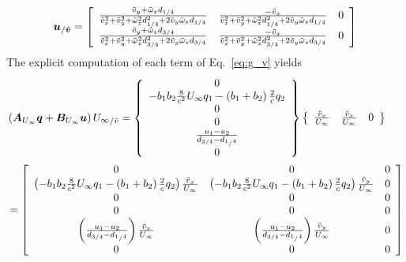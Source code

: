 \begin{equation}
	\bm{u}_{/\tilde{\bm{v}}} = \left[
	\begin{array}{ccc}
	\frac{\tilde{v}_y + \tilde{\omega}_z d_{1/4}}{\tilde{v}_x^2 + \tilde{v}_y^2 + 
		\tilde{\omega}_z^2 d_{1/4}^2 + 2 \tilde{v}_y \tilde{\omega}_z d_{1/4}} &
	\frac{-\tilde{v}_x}{\tilde{v}_x^2 + \tilde{v}_y^2 + 
		\tilde{\omega}_z^2 d_{1/4}^2 + 2 \tilde{v}_y \tilde{\omega}_z d_{1/4}} &
	0\\
	\frac{\tilde{v}_y + \tilde{\omega}_z d_{3/4}}{\tilde{v}_x^2 + \tilde{v}_y^2 + 
		\tilde{\omega}_z^2 d_{3/4}^2 + 2 \tilde{v}_y \tilde{\omega}_z d_{3/4}} &
	\frac{-\tilde{v}_x}{\tilde{v}_x^2 + \tilde{v}_y^2 + 
		\tilde{\omega}_z^2 d_{3/4}^2 + 2 \tilde{v}_y \tilde{\omega}_z d_{3/4}} &
	0
	\end{array}
	\right]
\end{equation}
The explicit computation of each term of Eq.~\ref{eq:g_v} yields
\begin{align}
&\left( \bm{A}_{U_\infty} \bm{q} + \bm{B}_{U_\infty} \bm{u}  \right) {U_\infty}_{/\tilde{v}}
	= \left\{
		\begin{array}{c}
			0 \\
			-b_1 b_2 \frac{8}{c^2} U_\infty q_1 - \left( b_1+b_2 \right) \frac{2}{c} q_2 \\
			0 \\
			0 \\
			\frac{u_1-u_2}{d_{3/4}-d_{1_/4}}\\
			0 
		\end{array}\right\}
		\left\{
		\begin{array}{ccc}
			\frac{\tilde{v}_x}{U_\infty} &
			\frac{\tilde{v}_x}{U_\infty} &
			0
		\end{array}\right\} \\
	&= \left[
		\begin{array}{ccc}
			0 & 0 & 0\\
			\left( -b_1 b_2 \frac{8}{c^2} U_\infty q_1 - \left( b_1+b_2 \right) \frac{2}{c} q_2 \right) \frac{\tilde{v}_x}{U_\infty} &
			\left( -b_1 b_2 \frac{8}{c^2} U_\infty q_1 - \left( b_1+b_2 \right) \frac{2}{c} q_2 \right) \frac{\tilde{v}_y}{U_\infty} & 0\\
			0 & 0 & 0\\
			0 & 0 & 0\\
			\left(  \frac{u_1-u_2}{d_{3/4}-d_{1_/4}} \right) \frac{\tilde{v}_x}{U_\infty} &
			\left(  \frac{u_1-u_2}{d_{3/4}-d_{1_/4}} \right) \frac{\tilde{v}_y}{U_\infty} & 0\\
			0 & 0 & 0
		\end{array} \right]
\end{align}
